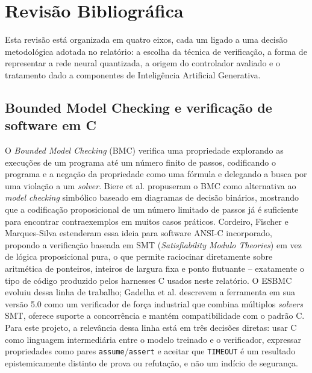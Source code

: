 \chapter{Revisão Bibliográfica}
\label{chap:revisao}

Esta revisão está organizada em quatro eixos, cada um ligado a uma decisão
metodológica adotada no relatório: a escolha da técnica de verificação, a
forma de representar a rede neural quantizada, a origem do controlador
avaliado e o tratamento dado a componentes de Inteligência Artificial
Generativa.

\section{Bounded Model Checking e verificação de software em C}
O \textit{Bounded Model Checking} (BMC) verifica uma propriedade
explorando as execuções de um programa até um número finito de passos,
codificando o programa e a negação da propriedade como uma fórmula e
delegando a busca por uma violação a um \textit{solver}. Biere et al.
\cite{biere1999symbolic} propuseram o BMC como alternativa ao
\textit{model checking} simbólico baseado em diagramas de decisão binários,
mostrando que a codificação proposicional de um número limitado de passos
já é suficiente para encontrar contraexemplos em muitos casos práticos.
Cordeiro, Fischer e Marques-Silva \cite{cordeiro2012smt} estenderam essa
ideia para software ANSI-C incorporado, propondo a verificação baseada em
SMT (\textit{Satisfiability Modulo Theories}) em vez de lógica proposicional
pura, o que permite raciocinar diretamente sobre aritmética de ponteiros,
inteiros de largura fixa e ponto flutuante -- exatamente o tipo de código
produzido pelos harnesses C usados neste relatório. O ESBMC evoluiu dessa
linha de trabalho; Gadelha et al. \cite{gadelha2018esbmc}
descrevem a ferramenta em sua versão 5.0 como um verificador de força
industrial que combina múltiplos \textit{solvers} SMT, oferece suporte a
concorrência e mantém compatibilidade com o padrão C. Para este projeto,
a relevância dessa linha está em três decisões diretas: usar C como
linguagem intermediária entre o modelo treinado e o verificador, expressar
propriedades como pares \texttt{assume}/\texttt{assert} e aceitar que
\texttt{TIMEOUT} é um resultado epistemicamente distinto de prova ou
refutação, e não um indício de segurança.

